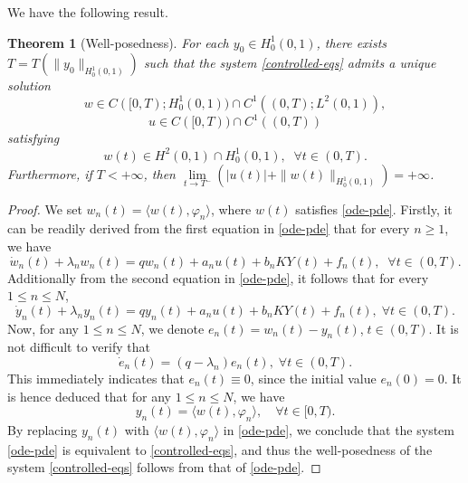 \documentclass[review]{elsarticle}
\newtheorem{theorem}{Theorem}[section]
\numberwithin{equation}{section}
\begin{document}
 We have the following result.
\begin{theorem}[Well-posedness]
\label{Well-posedness-th}
   For each $y_0\in H^1_0(0,1)$, there exists $T=T\left(\|y_0\|_{H^1_0(0,1)}\right)$ such that the system \eqref{controlled-eqs} admits a unique solution $$w\in C([0,T);H^1_0(0,1))\cap C^1((0,T);L^2(0,1)),$$ $$u\in C([0,T))\cap C^1((0,T))$$ satisfying $$w(t)\in H^2(0,1)\cap H^1_0(0,1),\;\; \forall t\in(0,T).$$ Furthermore, if $T<+\infty$, then $\lim\limits_{t\to T^-}(|u(t)|+\|w(t)\|_{H^1_0(0,1)})=+\infty$.
\end{theorem}
\begin{proof}
   We set $w_n(t)=\langle w(t),\varphi_n\rangle$, where $w(t)$ satisfies \eqref{ode-pde}. Firstly, it can be readily derived from the first equation in \eqref{ode-pde} that for every $ n\ge 1$, we have
    \begin{equation*}
        \dot{w}_n(t)+\lambda_nw_n(t)=qw_n(t)+a_nu(t)+b_nKY(t)+f_n(t) ,\;\; \forall t\in (0,T).
    \end{equation*}
    Additionally from the second equation in \eqref{ode-pde}, it follows that for every $ 1\le n\le N$, 
    \begin{equation*}
        \dot{y}_n(t)+\lambda_ny_n(t)=qy_n(t)+a_nu(t)+b_nKY(t)+f_n(t) ,\; \forall t\in (0,T).
    \end{equation*}
   Now, for any $ 1\le n\le N$, we denote $e_n(t)=w_n(t)-y_n(t)$,$\; t\in (0,T)$. It is not difficult to verify that
    \begin{equation*}
       \dot{e}_n(t)=(q-\lambda_n) e_n(t) ,\;\forall  t\in (0,T).
    \end{equation*}
This immediately indicates that $e_n(t)\equiv 0$, since the initial value $e_n(0)=0$.  It is hence deduced that for any $ 1\le n\le N$, we have $$ y_n(t) = \langle w(t),\varphi_n\rangle,\quad \forall t\in[0,T). $$ By replacing $y_n(t)$ with \( \langle w(t),\varphi_n\rangle \) in \eqref{ode-pde}, we conclude that the system \eqref{ode-pde} is equivalent to \eqref{controlled-eqs}, and thus the well-posedness of the system \eqref{controlled-eqs} follows from that of \eqref{ode-pde}.
\end{proof}
\end{document}
